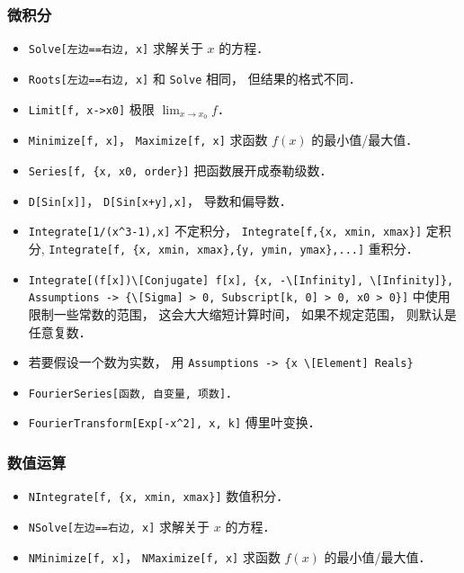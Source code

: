 \subsubsection{微积分}
\begin{itemize}
\item \verb|Solve[左边==右边, x]| 求解关于 $x$ 的方程．
\item \verb|Roots[左边==右边, x]| 和 \verb|Solve| 相同， 但结果的格式不同．
\item \verb|Limit[f, x->x0]| 极限 $\lim_{x\to x_0} f$．
\item \verb|Minimize[f, x]|， \verb|Maximize[f, x]| 求函数 $f(x)$ 的最小值/最大值．
\item \verb|Series[f, {x, x0, order}]| 把函数展开成泰勒级数．
\item \verb|D[Sin[x]]|， \verb|D[Sin[x+y],x]|， 导数和偏导数．
\item \verb|Integrate[1/(x^3-1),x]| 不定积分， \verb|Integrate[f,{x, xmin, xmax}]| 定积分, \verb|Integrate[f, {x, xmin, xmax},{y, ymin, ymax},...]| 重积分．
\item \verb|Integrate[(f[x])\[Conjugate] f[x], {x, -\[Infinity], \[Infinity]}, Assumptions -> {\[Sigma] > 0, Subscript[k, 0] > 0, x0 > 0}]| 中使用限制一些常数的范围， 这会大大缩短计算时间， 如果不规定范围， 则默认是任意复数．
\item 若要假设一个数为实数， 用 \verb|Assumptions -> {x \[Element] Reals}|
\item \verb|FourierSeries[函数, 自变量, 项数]|．
\item \verb|FourierTransform[Exp[-x^2], x, k]| 傅里叶变换．
\end{itemize}

\subsubsection{数值运算}
\begin{itemize}
\item \verb|NIntegrate[f, {x, xmin, xmax}]| 数值积分．
\item \verb|NSolve[左边==右边, x]| 求解关于 $x$ 的方程．
\item \verb|NMinimize[f, x]|， \verb|NMaximize[f, x]| 求函数 $f(x)$ 的最小值/最大值．
\end{itemize}

